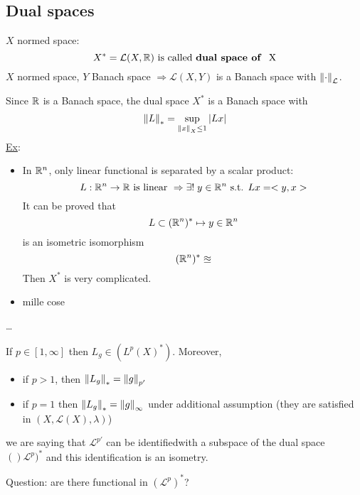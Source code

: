 \subsection*{Dual spaces}
\(X\) normed space: 
\[
    X^* = \mathcal{L}(X, \mathbb{R}) \mbox{ is called \textbf{dual space of } X}
\]
\(X\) normed space, \(Y\) Banach space \(\Rightarrow \mathcal{L}(X, Y)\) is a Banach space with \(\norm{\cdot}_{\mathcal{L}}\).

Since \(\mathbb{R}\) is a Banach space, the dual space \(X^*\) is a Banach space with 
\[
    \norm{L}_* = \sup_{\norm{x}_X \leq 1} \abs{Lx}
\]
\underline{Ex}: 
\begin{itemize}
    \item In \(\mathbb{R}^n\), only linear functional is separated by a scalar product:
        \[
            L : \mathbb{R}^n \to \mathbb{R} \mbox{ is linear } \Rightarrow \exists ! \; y \in \mathbb{R}^n \mbox{ s.t. } Lx = <y,x>
        \]
        It can be proved that 
        \[
            L \subset (\mathbb{R}^n)^* \mapsto y \in \mathbb{R}^n
        \]
        is an isometric isomorphism 
        \[
            (\mathbb{R}^n)^* \approxeq 
        \]
        Then \(X^*\) is very complicated.
    \item mille cose 
\end{itemize}

\dots

\begin{proposition}
    If \(p \in [1, \infty]\) then \(L_g \in (L^p(X)^*)\). Moreover, 
    \begin{itemize}
        \item if \(p > 1\), then \(\norm{L_g}_* = \norm{g}_{p'}\)
        \item if \(p=1\) then \(\norm{L_g}_* = \norm{g}_{\infty}\) under additional assumption (they are satisfied in \((X, \mathcal{L}(X), \lambda)\))
    \end{itemize}
\end{proposition}

\begin{remark}
    we are saying that \(\mathcal{L}^{p'}\) can be identifiedwith a subspace of the dual space \(()\mathcal{L}^p)^*\) and this identification is an isometry.
\end{remark}

Question: are there functional in \((\mathcal{L}^p)^*\)?

